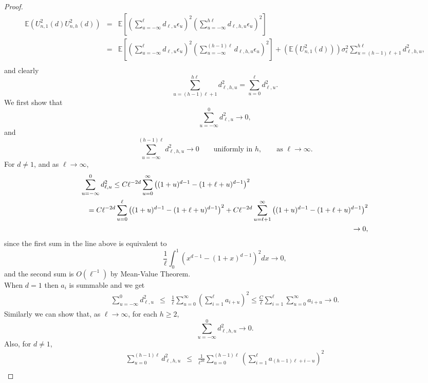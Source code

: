 \documentclass[12pt]{article}
\begin{document}
\begin{proof}
$$$$
\begin{eqnarray}\label{cov-cov}
\mathbb{E}(U^2_{n,1}(d)U_{n,h}^2(d))&=&\mathbb{E}\left[\left(\sum_{u=-\infty}^\ell d_{\ell,u}\epsilon_u\right)^2\left(\sum_{u=-\infty}^{h\ell} d_{\ell,h,u}\epsilon_u\right)^2\right]\\
&=&\mathbb{E}\left[\left(\sum_{u=-\infty}^\ell d_{\ell,u}\epsilon_u\right)^2\left(\sum_{u=-\infty}^{(h-1)\ell} d_{\ell,h,u}\epsilon_u\right)^2\right]+
\left(\mathbb{E} (U^2_{n,1}(d))\right)\sigma^2_\epsilon\sum_{u=(h-1)\ell+1}^{h\ell}d_{\ell,h,u}^2,\nonumber\\
\end{eqnarray}
and clearly 
$$
\sum_{u=(h-1)\ell+1}^{h\ell}d_{\ell,h,u}^2=\sum_{u=0}^\ell d_{\ell,u}^2.
$$
We first show that
\begin{equation}\label{l limit}
\sum_{u=-\infty}^0d_{\ell,u}^2\to0,
\end{equation}
and
\begin{equation}\label{h limit}
\sum_{u=-\infty}^{(h-1)\ell} d_{\ell,h,u}^2\to0\qquad\textrm{uniformly in  }h,\qquad\textrm{as }\ell\to\infty.
\end{equation}
For $d\neq1$, and as $\ell\to\infty$,
\begin{eqnarray*}\lefteqn{
\sum_{u=-\infty}^0d_{\ell,u}^2\le C\ell^{-2d}\sum_{u=0}^\infty\left((1+u)^{d-1}-(1+\ell+u)^{d-1}\right)^2}\\
&&=C\ell^{-2d}\sum_{u=0}^\ell\left((1+u)^{d-1}-(1+\ell+u)^{d-1}\right)^2+C\ell^{-2d}\sum_{u=\ell+1}^\infty\left((1+u)^{d-1}-(1+\ell+u)^{d-1}\right)^2\\
&&\to0,
\end{eqnarray*}
since the first sum in the line above is equivalent to
$$
\frac{1}{\ell}\int_0^1\left(x^{d-1}-(1+x)^{d-1}\right)^2dx\to0,
$$
and the second sum is $O(\ell^{-1})$ by Mean-Value Theorem.\\
When $d=1$ then $a_{i}$ is summable and we get
\begin{eqnarray*}
\sum_{u=-\infty}^0d_{\ell,u}^2&\le& \frac{1}{\ell}\sum_{u=0}^\infty
\left(\sum_{i=1}^\ell a_{i+u}\right)^2\le\frac{C}{\ell}\sum_{i=1}^\ell\sum_{u=0}^\infty a_{i+u}\to0.
\end{eqnarray*} 
Similarly we can show that, as $\ell\to\infty$, for each $h\ge2$,
$$
\sum_{u=-\infty}^0d_{\ell,h,u}^2\to0.
$$
Also, for $d\neq1$,
\begin{eqnarray*}
\sum_{u=0}^{(h-1)\ell} d_{\ell,h,u}^2&\le& \frac{1}{\ell^{2d}}\sum_{u=0}^{(h-1)\ell}
\left(\sum_{i=1}^\ell a_{(h-1)\ell+i-u}\right)^2\\

\end{eqnarray*}
\end{proof}
\end{document}
